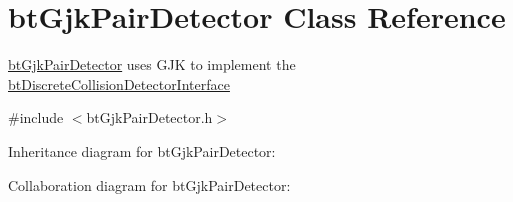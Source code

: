 \hypertarget{classbt_gjk_pair_detector}{\section{bt\+Gjk\+Pair\+Detector Class Reference}
\label{classbt_gjk_pair_detector}
}


\hyperlink{classbt_gjk_pair_detector}{bt\+Gjk\+Pair\+Detector} uses G\+J\+K to implement the \hyperlink{structbt_discrete_collision_detector_interface}{bt\+Discrete\+Collision\+Detector\+Interface}  




{\ttfamily \#include $<$bt\+Gjk\+Pair\+Detector.\+h$>$}



Inheritance diagram for bt\+Gjk\+Pair\+Detector\+:


Collaboration diagram for bt\+Gjk\+Pair\+Detector\+:
